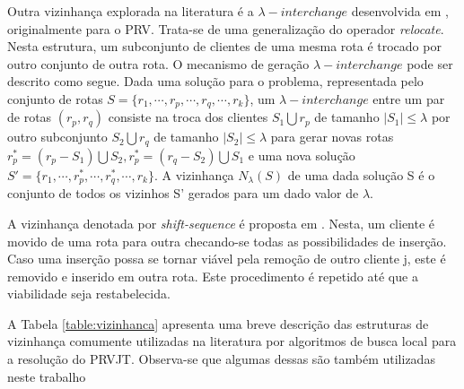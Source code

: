 Outra vizinhança explorada na literatura é a \(\lambda-interchange\) desenvolvida em \cite{Osman}, originalmente para o PRV. Trata-se de uma generalização do operador \textit{relocate}. Nesta estrutura, um subconjunto de clientes de uma mesma rota é trocado por outro conjunto de outra rota. O mecanismo de geração \(\lambda-interchange\) pode ser descrito como segue. Dada uma solução para o problema, representada pelo conjunto de rotas \(S = \{r_1, \cdots,r_p, \cdots,r_q,\cdots,r_k\}\), um \(\lambda-interchange\) entre um par de rotas \((r_p, r_q)\) consiste na troca dos clientes \(S_1\bigcup r_p\) de tamanho \(|S_1|\leq\lambda\) por outro subconjunto \(S_2\bigcup r_q\) de tamanho \(|S_2|\leq\lambda\) para gerar novas rotas \(r^\ast_p = (r_p-S_1)\bigcup S_2, r^\ast_p = (r_q - S_2) \bigcup S_1 \) e uma nova solução  \(S' = \{r_1, \cdots,r^\ast_p, \cdots,r^\ast_q,\cdots,r_k\}\).
A vizinhança \(N_\lambda(S)\) de uma dada solução S é o conjunto de todos os vizinhos S' gerados para um dado valor de \(\lambda\).

A vizinhança denotada por \textit{shift-sequence} é proposta em \cite{Schulze}.  Nesta, um cliente é movido de uma rota para outra checando-se todas as possibilidades de inserção. Caso uma inserção possa se tornar viável pela remoção de outro cliente j, este é removido e inserido em outra rota. Este procedimento é repetido até que a viabilidade seja restabelecida.


A Tabela \ref{table:vizinhanca} apresenta uma breve descrição das estruturas de vizinhança comumente
utilizadas na literatura por algoritmos de busca local para a resolução do PRVJT. Observa-se
que algumas dessas são também utilizadas neste trabalho


